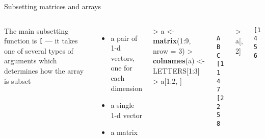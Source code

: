 \documentclass[10pt,ignorenonframetext,compress, aspectratio=169]{beamer}
\newenvironment{Shaded}{\begin{snugshade}}{\end{snugshade}}
\newcommand{\KeywordTok}[1]{\textcolor[rgb]{0.13,0.29,0.53}{\textbf{{#1}}}}
\newcommand{\DataTypeTok}[1]{\textcolor[rgb]{0.13,0.29,0.53}{{#1}}}
\newcommand{\DecValTok}[1]{\textcolor[rgb]{0.00,0.00,0.81}{{#1}}}
\newcommand{\StringTok}[1]{\textcolor[rgb]{0.31,0.60,0.02}{{#1}}}
\newcommand{\NormalTok}[1]{{#1}}
\providecommand{\tightlist}{%
  \setlength{\itemsep}{0pt}\setlength{\parskip}{0pt}}
\newcommand{\columnsbegin}{\begin{columns}}
\newcommand{\columnsend}{\end{columns}}
\begin{document}
\begin{frame}[fragile]{Subsetting matrices and arrays}

\columnsbegin
{}

The main subsetting function is \texttt{{[}} --- it takes one of several
types of arguments which determines how the array is subset

\begin{itemize}
\tightlist
\item
  a pair of 1-d vectors, one for each dimension
\item
  a single 1-d vector
\item
  a matrix
\end{itemize}


\begin{Shaded}
\begin{Highlighting}[]
\NormalTok{>}\StringTok{ }\NormalTok{a <-}\StringTok{ }\KeywordTok{matrix}\NormalTok{(}\DecValTok{1}\NormalTok{:}\DecValTok{9}\NormalTok{, }\DataTypeTok{nrow =} \DecValTok{3}\NormalTok{)}
\NormalTok{>}\StringTok{ }\KeywordTok{colnames}\NormalTok{(a) <-}\StringTok{ }\NormalTok{LETTERS[}\DecValTok{1}\NormalTok{:}\DecValTok{3}\NormalTok{]}
\NormalTok{>}\StringTok{ }\NormalTok{a[}\DecValTok{1}\NormalTok{:}\DecValTok{2}\NormalTok{, ]}
\end{Highlighting}
\end{Shaded}

\begin{verbatim}
     A B C
[1,] 1 4 7
[2,] 2 5 8
\end{verbatim}

\begin{Shaded}
\begin{Highlighting}[]
\NormalTok{>}\StringTok{ }\NormalTok{a[, }\DecValTok{2}\NormalTok{]}
\end{Highlighting}
\end{Shaded}

\begin{verbatim}
[1] 4 5 6
\end{verbatim}

\columnsend

\end{frame}
\end{document}
